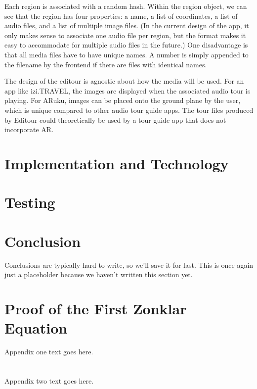 \documentclass[a4paper, 10pt, american]{article}
\begin{document}
Each region is associated with a random hash. Within the region object, we can
see that the region has four properties: a name, a list of coordinates, a list
of audio files, and a list of multiple image files. (In the current design of
the app, it only makes sense to associate one audio file per region, but the
format makes it easy to accommodate for multiple audio files in the future.)
One disadvantage is that all media files have to have unique names.  A number
is simply appended to the filename by the frontend if there are files with
identical names.

The design of the editour is agnostic about how the media will be used.  For
an app like izi.TRAVEL, the images are displayed when the associated audio
tour is playing. For ARuku, images can be placed onto the ground plane by the
user, which is unique compared to other audio tour guide apps. The tour files
produced by Editour could theoretically be used by a tour guide app that does
not incorporate AR.

\section{Implementation and Technology}
\label{sec:implementationAndTechnology}

\section{Testing}
\label{sec:testing}

\section{Conclusion}
\label{sec:conclusion}

Conclusions are typically hard to write, so we'll save it for last. This is
once again just a placeholder because we haven't written this section yet.

\lipsum[1]

\clearpage %

\printbibliography

\appendices
\section{Proof of the First Zonklar Equation}
Appendix one text goes here.

\section{}
Appendix two text goes here.
\end{document}
